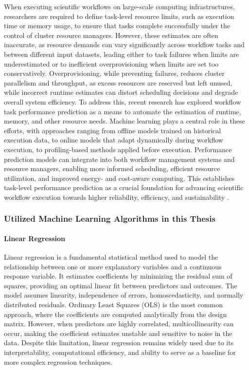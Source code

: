 When executing scientific workflows on large-scale computing infrastructures, researchers are required to define task-level resource limits, such as execution time or memory usage, to ensure that tasks complete successfully under the control of cluster resource managers. However, these estimates are often inaccurate, as resource demands can vary significantly across workflow tasks and between different input datasets, leading either to task failures when limits are underestimated or to inefficient overprovisioning when limits are set too conservatively. Overprovisioning, while preventing failures, reduces cluster parallelism and throughput, as excess resources are reserved but left unused, while incorrect runtime estimates can distort scheduling decisions and degrade overall system efficiency. To address this, recent research has explored workflow task performance prediction as a means to automate the estimation of runtime, memory, and other resource needs. Machine learning plays a central role in these efforts, with approaches ranging from offline models trained on historical execution data, to online models that adapt dynamically during workflow execution, to profiling-based methods applied before execution. Performance prediction models can integrate into both workflow management systems and resource managers, enabling more informed scheduling, efficient resource utilization, and improved energy- and cost-aware computing. This establishes task-level performance prediction as a crucial foundation for advancing scientific workflow execution towards higher reliability, efficiency, and sustainability \cite{bader2025predictingperformancescientificworkflows}.

\subsubsection{Utilized Machine Learning Algorithms in this Thesis}
\label{sec:background_ml_algorithms}

\paragraph{Linear Regression}
\label{sec:background_ml_lr}
Linear regression is a fundamental statistical method used to model the relationship between one or more explanatory variables and a continuous response variable. It estimates coefficients by minimizing the residual sum of squares, providing an optimal linear fit between predictors and outcomes. The model assumes linearity, independence of errors, homoscedasticity, and normally distributed residuals. Ordinary Least Squares (OLS) is the most common approach, where the coefficients are computed analytically from the design matrix. However, when predictors are highly correlated, multicollinearity can occur, making the coefficient estimates unstable and sensitive to noise in the data. Despite this limitation, linear regression remains widely used due to its interpretability, computational efficiency, and ability to serve as a baseline for more complex regression techniques.

